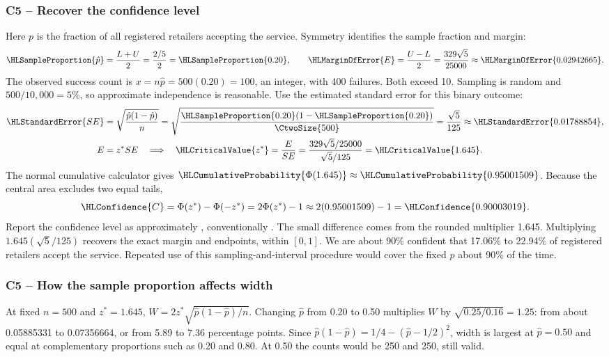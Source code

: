 \subsubsection*{C5 -- Recover the confidence level}\label{sol:c5-3-a}
Here $p$ is the fraction of all registered retailers accepting the service. Symmetry identifies the sample fraction and margin:
\[
\HLSampleProportion{\hat p}=\frac{L+U}{2}=\frac{2/5}{2}=\HLSampleProportion{0.20},\qquad
\HLMarginOfError{E}=\frac{U-L}{2}=\frac{329\sqrt5}{25000}\approx\HLMarginOfError{0.02942665}.
\]
The observed success count is $x=n\hat p=500(0.20)=100$, an integer, with 400 failures. Both exceed 10. Sampling is random and $500/10{,}000=5\%$, so approximate independence is reasonable. Use the estimated standard error for this binary outcome:
\begin{align*}
\HLStandardError{SE}&=\sqrt{\frac{\hat p(1-\hat p)}{n}}
=\sqrt{\frac{\HLSampleProportion{0.20}(1-\HLSampleProportion{0.20})}{\CtwoSize{500}}}
=\frac{\sqrt5}{125}\approx\HLStandardError{0.01788854},\\
E&=z^*SE\quad\Longrightarrow\quad
\HLCriticalValue{z^*}=\frac{E}{SE}
=\frac{329\sqrt5/25000}{\sqrt5/125}=\HLCriticalValue{1.645}.
\end{align*}
The normal cumulative calculator gives $\HLCumulativeProbability{\Phi(1.645)}\approx\HLCumulativeProbability{0.95001509}$. Because the central area excludes two equal tails,
\[
\HLConfidence{C}=\Phi(z^*)-\Phi(-z^*)=2\Phi(z^*)-1
\approx2(0.95001509)-1=\HLConfidence{0.90003019}.
\]
Report the confidence level as approximately , conventionally . The small difference comes from the rounded multiplier 1.645. Multiplying $1.645(\sqrt5/125)$ recovers the exact margin and endpoints, within $[0,1]$. We are about 90\% confident that 17.06\% to 22.94\% of registered retailers accept the service. Repeated use of this sampling-and-interval procedure would cover the fixed $p$ about 90\% of the time.

\subsubsection*{C5 -- How the sample proportion affects width}\label{sol:c5-3-b}
At fixed $n=500$ and $z^*=1.645$, $W=2z^*\sqrt{\hat p(1-\hat p)/n}$. Changing $\hat p$ from 0.20 to 0.50 multiplies $W$ by $\sqrt{0.25/0.16}=1.25$: from about 0.05885331 to 0.07356664, or from 5.89 to 7.36 percentage points. Since $\hat p(1-\hat p)=1/4-(\hat p-1/2)^2$, width is largest at $\hat p=0.50$ and equal at complementary proportions such as 0.20 and 0.80. At 0.50 the counts would be 250 and 250, still valid.
\clearpage

